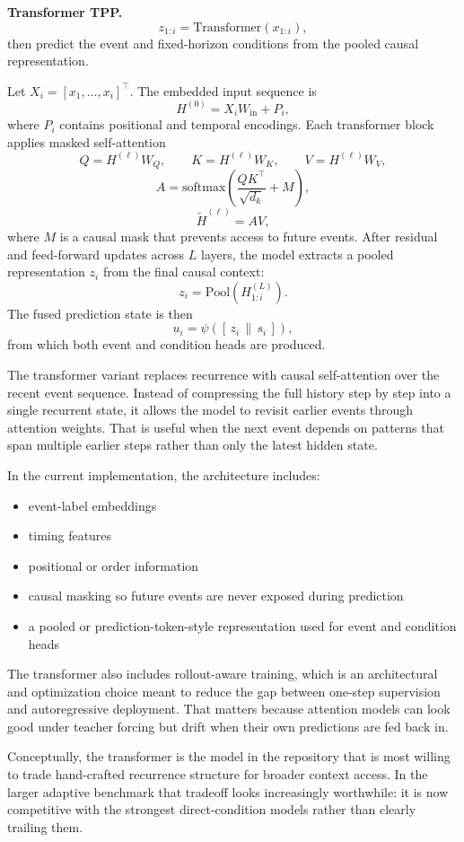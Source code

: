 \documentclass[11pt]{article}
\begin{document}
\textbf{Transformer TPP.}
\[
z_{1:i} = \mathrm{Transformer}(x_{1:i}),
\]
then predict the event and fixed-horizon conditions from the pooled causal representation.

Let \(X_i = [x_1,\dots,x_i]^\top\). The embedded input sequence is
\[
H^{(0)} = X_i W_{\mathrm{in}} + P_i,
\]
where \(P_i\) contains positional and temporal encodings. Each transformer block applies masked self-attention
\[
Q = H^{(\ell)} W_Q, \qquad K = H^{(\ell)} W_K, \qquad V = H^{(\ell)} W_V,
\]
\[
A = \mathrm{softmax}\!\left(\frac{QK^\top}{\sqrt{d_k}} + M\right),
\]
\[
\tilde{H}^{(\ell)} = A V,
\]
where \(M\) is a causal mask that prevents access to future events. After residual and feed-forward updates across \(L\) layers, the model extracts a pooled representation \(z_i\) from the final causal context:
\[
z_i = \mathrm{Pool}(H^{(L)}_{1:i}).
\]
The fused prediction state is then
\[
u_i = \psi([\, z_i \, \| \, s_i \,]),
\]
from which both event and condition heads are produced.

The transformer variant replaces recurrence with causal self-attention over the recent event sequence. Instead of compressing the full history step by step into a single recurrent state, it allows the model to revisit earlier events through attention weights. That is useful when the next event depends on patterns that span multiple earlier steps rather than only the latest hidden state.

In the current implementation, the architecture includes:
\begin{itemize}
  \item event-label embeddings
  \item timing features
  \item positional or order information
  \item causal masking so future events are never exposed during prediction
  \item a pooled or prediction-token-style representation used for event and condition heads
\end{itemize}

The transformer also includes rollout-aware training, which is an architectural and optimization choice meant to reduce the gap between one-step supervision and autoregressive deployment. That matters because attention models can look good under teacher forcing but drift when their own predictions are fed back in.

Conceptually, the transformer is the model in the repository that is most willing to trade hand-crafted recurrence structure for broader context access. In the larger adaptive benchmark that tradeoff looks increasingly worthwhile: it is now competitive with the strongest direct-condition models rather than clearly trailing them.
\end{document}
